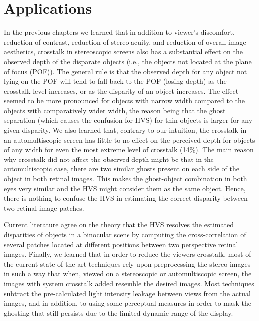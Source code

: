 \chapter{Applications}
\label{chap:applicatons}
In the previous chapters we learned that in addition to viewer's discomfort, reduction of contrast, reduction of stereo acuity, and reduction of overall image aesthetics, crosstalk in stereoscopic screens also has a substantial effect on the observed depth of the disparate objects (i.e., the objects not located at the plane of focus (POF)). The general rule is that the observed depth for any object not lying on the POF will tend to fall back to the POF (losing depth) as the crosstalk level increases, or as the disparity of an object increases. The effect seemed to be more pronounced for objects with narrow width compared to the objects with comparatively wider width, the reason being that the ghost separation (which causes the confusion for HVS) for thin objects is larger for any given disparity. We also learned that, contrary to our intuition, the crosstalk in an automultiscopic screen has little to no effect on the perceived depth for objects of any width for even the most extreme level of crosstalk (14\%). The main reason why crosstalk  did not affect the observed depth might be that in the automultiscopic case, there are two similar ghosts present on each side of the object in both retinal images. This makes the ghost-object combination in both eyes very similar and the HVS might consider them as the same object. Hence, there is nothing to confuse the HVS in estimating the correct disparity between two retinal image patches.

Current literature agree on the theory that the HVS resolves the estimated disparities of objects in a binocular scene by computing the cross-correlation of several patches located at different positions between two perspective retinal images. Finally, we learned that in order to reduce the viewers crosstalk, most of the current state of the art techniques rely upon preprocessing the stereo images in such a way that when, viewed on a stereoscopic or automultiscopic screen, the 
images with system crosstalk added resemble the desired images. Most techniques subtract the pre-calculated light intensity leakage between views from the actual images, and in addition, to using some perceptual measures in order to mask the ghosting that still persists due to the limited dynamic range of the display.

